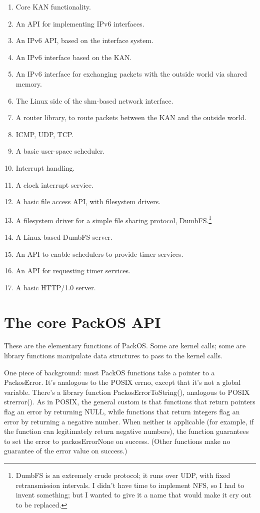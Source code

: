 \documentclass{article}
\begin{document}
\begin{enumerate}
\item{Core KAN functionality.}
\item{An API for implementing IPv6 interfaces.}
\item{An IPv6 API, based on the interface system.}
\item{An IPv6 interface based on the KAN.}
\item{An IPv6 interface for exchanging packets with the outside world
  via shared memory.}
\item{The Linux side of the shm-based network interface.}
\item{A router library, to route packets between the KAN and the
  outside world.}
\item{ICMP, UDP, TCP.}
\item{A basic user-space scheduler.}
\item{Interrupt handling.}
\item{A clock interrupt service.}
\item{A basic file access API, with filesystem drivers.}
\item{A filesystem driver for a simple file sharing protocol,
  DumbFS.\footnote{DumbFS is an extremely crude protocol; it runs over
  UDP, with fixed retransmission intervals.  I didn't have time to
  implement NFS, so I had to invent something; but I wanted to give it
  a name that would make it cry out to be replaced.}}
\item{A Linux-based DumbFS server.}
\item{An API to enable schedulers to provide timer services.}
\item{An API for requesting timer services.}
\item{A basic HTTP/1.0 server.}
\end{enumerate}

\section{The core PackOS API}

These are the elementary functions of PackOS.  Some are kernel calls;
some are library functions manipulate data structures to pass to the
kernel calls.

One piece of background: most PackOS functions take a pointer to a
PackosError.  It's analogous to the POSIX errno, except that it's not
a global variable.  There's a library function PackosErrorToString(),
analogous to POSIX strerror().  As in POSIX, the general custom is
that functions that return pointers flag an error by returning NULL,
while functions that return integers flag an error by returning a
negative number.  When neither is applicable (for example, if the
function can legitimately return negative numbers), the function
guarantees to set the error to packosErrorNone on success.  (Other
functions make no guarantee of the error value on success.)
\end{document}

